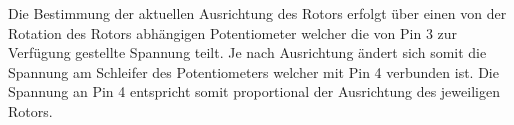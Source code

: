 Die Bestimmung der aktuellen Ausrichtung des Rotors erfolgt über einen von der Rotation des Rotors abhängigen Potentiometer welcher die von Pin 3 zur Verfügung gestellte Spannung teilt. Je nach Ausrichtung ändert sich somit die Spannung am Schleifer des Potentiometers welcher mit Pin 4 verbunden ist. Die Spannung an Pin 4 entspricht somit proportional der Ausrichtung des jeweiligen Rotors.